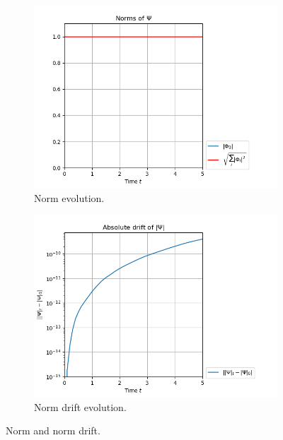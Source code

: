 \documentclass[11pt, a4paper, oneside]{article}
\begin{document}
\begin{figure}[h]
  \begin{subfigure}[b]{0.45 \textwidth}
    \includegraphics[width = \textwidth]{graphics/threefold_morse/norms_block0.PNG}
    \caption{Norm evolution.}
  \end{subfigure}
  \hfill
  \begin{subfigure}[b]{0.45 \textwidth}
    \includegraphics[width = \textwidth]{graphics/threefold_morse/norms_drift_block0_log.PNG}
    \caption{Norm drift evolution.}
  \end{subfigure}
  \caption{Norm and norm drift.}
  \label{fig:threefold_norm}
\end{figure}
\end{document}
